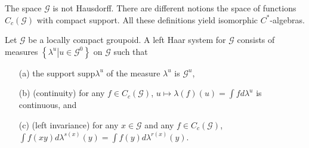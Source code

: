 \documentclass{beamer}
\theoremstyle{plain}
\newcommand{\G}{\mathcal{G}}
\newcommand{\supp}{\mathrm{supp}}
\newcommand{\la}{\lambda}
\begin{document}
\begin{frame}
	The space $\G$ is not Hausdorff. There are different notions the space of functions  $C_c\left( \G\right)$  with compact support. All these definitions yield isomorphic $C^*$-algebras.
\begin{definition}
Let $\G$ be a locally compact groupoid. A \alert{left  Haar system} for $\G$
consists of measures $\left\{\left.\la^u \right| u \in \G^0\right\}$ on $\G$ such that
\begin{enumerate}
	\item [(a)] the support $\supp\la^u$ of the measure $\la^u$ is $\G^u$,
	\item [(b)]  (continuity) for any $f \in C_c\left(\G\right)$, $u \mapsto \la(f)(u) = \int f d\la^u$ is continuous, and
	\item [(c)]  (left invariance) for any $x\in \G$ and any $f \in  C_c(\G )$, $\int  f ( x y ) d\la^{s(x)}(y) =
	\int f(y)d\la^{r(x)}(y)$.
	
\end{enumerate}
\end{definition}
\end{frame}
\end{document}
